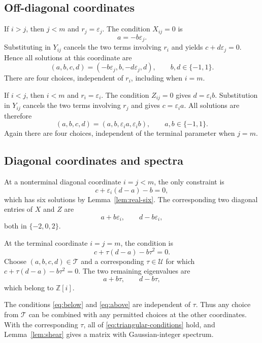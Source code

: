 \documentclass[11pt]{amsart}
\theoremstyle{definition}
\theoremstyle{remark}
\newcommand{\Z}{\mathbb Z}
\newcommand{\U}{\mathcal U}
\numberwithin{equation}{section}
\begin{document}
\subsection{Off-diagonal coordinates}

If $i>j$, then $j<m$ and $r_j=\varepsilon_j$. The condition $X_{ij}=0$ is
\[
 a=-b\varepsilon_j.
\]
Substituting in $Y_{ij}$ cancels the two terms involving $r_i$ and yields $c+d\varepsilon_j=0$. Hence all solutions at this coordinate are
\begin{equation}\label{eq:below}
 (a,b,c,d)=(-b\varepsilon_j,b,-d\varepsilon_j,d),
 \qquad b,d\in\{-1,1\}.
\end{equation}
There are four choices, independent of $r_i$, including when $i=m$.

If $i<j$, then $i<m$ and $r_i=\varepsilon_i$. The condition $Z_{ij}=0$ gives $d=\varepsilon_i b$. Substitution in $Y_{ij}$ cancels the two terms involving $r_j$ and gives $c=\varepsilon_i a$. All solutions are therefore
\begin{equation}\label{eq:above}
 (a,b,c,d)=(a,b,\varepsilon_i a,\varepsilon_i b),
 \qquad a,b\in\{-1,1\}.
\end{equation}
Again there are four choices, independent of the terminal parameter when $j=m$.

\subsection{Diagonal coordinates and spectra}

At a nonterminal diagonal coordinate $i=j<m$, the only constraint is
\[
 c+\varepsilon_i(d-a)-b=0,
\]
which has six solutions by Lemma~\ref{lem:real-six}. The corresponding two diagonal entries of $X$ and $Z$ are
\begin{equation}\label{eq:real-eigenvalues}
 a+b\varepsilon_i,\qquad d-b\varepsilon_i,
\end{equation}
both in $\{-2,0,2\}$.

At the terminal coordinate $i=j=m$, the condition is
\[
 c+\tau(d-a)-b\tau^2=0.
\]
Choose $(a,b,c,d)\in\mathcal T$ and a corresponding $\tau\in\U$ for which $c+\tau(d-a)-b\tau^2=0$. The two remaining eigenvalues are
\begin{equation}\label{eq:terminal-eigenvalues}
 a+b\tau,\qquad d-b\tau,
\end{equation}
which belong to $\Z[i]$.

The conditions \eqref{eq:below} and \eqref{eq:above} are independent of $\tau$. Thus any choice from $\mathcal T$ can be combined with any permitted choices at the other coordinates. With the corresponding $\tau$, all of \eqref{eq:triangular-conditions} hold, and Lemma~\ref{lem:shear} gives a matrix with Gaussian-integer spectrum.
\end{document}
